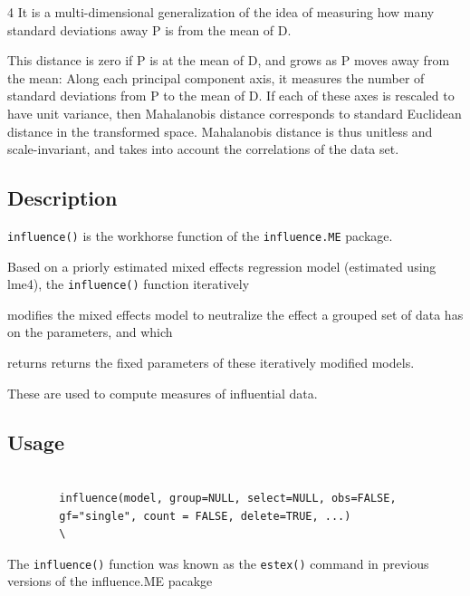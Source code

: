 \documentclass[Main.tex]{subfiles}
\begin{document}
	4 It is a multi-dimensional generalization of the idea of measuring how many standard deviations away P is from the mean of D. 
	
	This distance is zero if P is at the mean of D, and grows as P moves away from the mean: Along each principal component axis, it measures the 
	number of standard deviations from P to the mean of D. If each of these axes is rescaled to have unit variance, then Mahalanobis distance corresponds to standard Euclidean distance in the transformed space. Mahalanobis distance is thus unitless and scale-invariant, and takes into account the correlations of the data set.
	
	\subsection*{Description}
	\texttt{influence()} is the workhorse function of the \texttt{influence.ME} package. 
	
	
	Based on a priorly estimated mixed effects regression model (estimated using lme4), the \texttt{influence()} function iteratively 
	
	modifies the mixed effects model to neutralize the effect a grouped set of data has on the parameters, and which 
	
	returns returns the fixed parameters of these iteratively modified models. 
	
	These are used to compute measures of influential data.
	
	
	
	
	\subsection*{Usage}
	\begin{framed}
		\begin{verbatim}
		
		influence(model, group=NULL, select=NULL, obs=FALSE, 
		gf="single", count = FALSE, delete=TRUE, ...)
		\
		\end{verbatim}
	\end{framed}
	
	
	The \texttt{influence()} function was known as the \texttt{estex()} command in previous versions of the influence.ME pacakge
\end{document}
